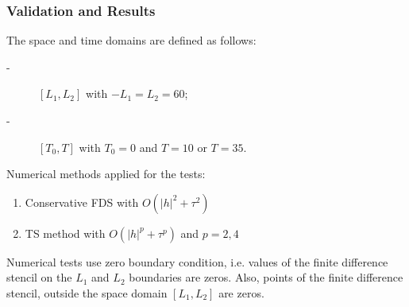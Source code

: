 \documentclass{beamer}
\begin{document}
\begin{frame}
\frametitle{Validation and Results}
The space and time domains are defined as follows:
\begin{description}
 \item[-] $[L_1,L_2]$ with $-L_1 = L_2 = 60$;
 \item[-] $[T_0,T]$ with $T_0 = 0$ and $T = 10$ or $T = 35$.
\end{description}

Numerical methods applied for the tests:
\begin{enumerate}
  \item Conservative FDS with $O(|h|^2 + \tau^2)$
  \item TS method with $O(|h|^p + \tau^p)$ and $p = 2, 4$
\end{enumerate}

Numerical tests use zero boundary condition, i.e. values of the finite difference stencil on the $L_1$ and $L_2$ boundaries are zeros. Also, points of the finite difference stencil, outside the space domain $[L_1,L_2]$ are zeros.
\end{frame}
\end{document}
